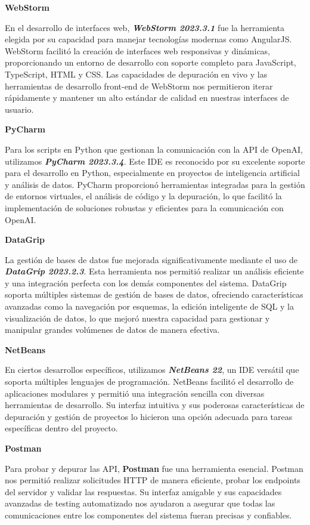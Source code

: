 \textbf{WebStorm}

En el desarrollo de interfaces web, \textbf{\textit{WebStorm 2023.3.1}} fue la herramienta elegida por su capacidad para manejar tecnologías modernas como AngularJS. WebStorm facilitó la creación de interfaces web responsivas y dinámicas, proporcionando un entorno de desarrollo con soporte completo para JavaScript, TypeScript, HTML y CSS. Las capacidades de depuración en vivo y las herramientas de desarrollo front-end de WebStorm nos permitieron iterar rápidamente y mantener un alto estándar de calidad en nuestras interfaces de usuario.

\textbf{PyCharm}

Para los scripts en Python que gestionan la comunicación con la API de OpenAI, utilizamos \textbf{\textit{PyCharm 2023.3.4}}. Este IDE es reconocido por su excelente soporte para el desarrollo en Python, especialmente en proyectos de inteligencia artificial y análisis de datos. PyCharm proporcionó herramientas integradas para la gestión de entornos virtuales, el análisis de código y la depuración, lo que facilitó la implementación de soluciones robustas y eficientes para la comunicación con OpenAI.

\textbf{DataGrip}

La gestión de bases de datos fue mejorada significativamente mediante el uso de \textbf{\textit{DataGrip 2023.2.3}}. Esta herramienta nos permitió realizar un análisis eficiente y una integración perfecta con los demás componentes del sistema. DataGrip soporta múltiples sistemas de gestión de bases de datos, ofreciendo características avanzadas como la navegación por esquemas, la edición inteligente de SQL y la visualización de datos, lo que mejoró nuestra capacidad para gestionar y manipular grandes volúmenes de datos de manera efectiva.

\textbf{NetBeans}

En ciertos desarrollos específicos, utilizamos \textbf{\textit{NetBeans 22}}, un IDE versátil que soporta múltiples lenguajes de programación. NetBeans facilitó el desarrollo de aplicaciones modulares y permitió una integración sencilla con diversas herramientas de desarrollo. Su interfaz intuitiva y sus poderosas características de depuración y gestión de proyectos lo hicieron una opción adecuada para tareas específicas dentro del proyecto.

\textbf{Postman}

Para probar y depurar las API, \textbf{Postman} fue una herramienta esencial. Postman nos permitió realizar solicitudes HTTP de manera eficiente, probar los endpoints del servidor y validar las respuestas. Su interfaz amigable y sus capacidades avanzadas de testing automatizado nos ayudaron a asegurar que todas las comunicaciones entre los componentes del sistema fueran precisas y confiables.


